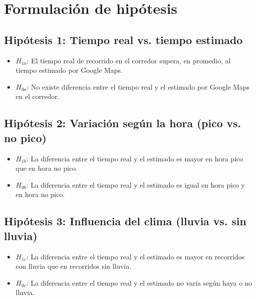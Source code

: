 \section{Formulación de hipótesis}

\subsection*{Hipótesis 1: Tiempo real vs. tiempo estimado}
\begin{itemize}
    \item \textbf{$H_{1a}$}: El tiempo real de recorrido en el corredor supera, en promedio, al tiempo estimado por Google Maps.
    \item \textbf{$H_{0a}$}: No existe diferencia entre el tiempo real y el estimado por Google Maps en el corredor.
\end{itemize}

\subsection*{Hipótesis 2: Variación según la hora (pico vs. no pico)}
\begin{itemize}
    \item \textbf{$H_{1b}$}: La diferencia entre el tiempo real y el estimado es mayor en hora pico que en hora no pico.
    \item \textbf{$H_{0b}$}: La diferencia entre el tiempo real y el estimado es igual en hora pico y en hora no pico.
\end{itemize}

\subsection*{Hipótesis 3: Influencia del clima (lluvia vs. sin lluvia)}
\begin{itemize}
    \item \textbf{$H_{1c}$}: La diferencia entre el tiempo real y el estimado es mayor en recorridos con lluvia que en recorridos sin lluvia.
    \item \textbf{$H_{0c}$}: La diferencia entre el tiempo real y el estimado no varía según haya o no lluvia.
\end{itemize}